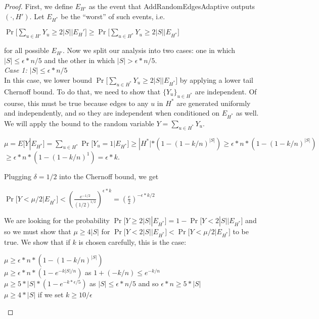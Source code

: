 \documentclass{article}
\begin{document}
\begin{proof}
First, we define $E_{H'}$ as the event that AddRandomEdgesAdaptive outputs $(\cdot, H')$. Let $E_{H^*}$ be the ``worst'' of such events, i.e.
\begin{center}
    $\Pr \big[\sum_{u \in H'} Y_u \geq 2|S| \big | E_H'\big ] \geq \Pr\big [\sum_{u \in H^*} Y_u \geq 2|S| \big | E_{H^*}\big ]$
\end{center}
for all possible $E_{H'}$. Now we split our analysis into two cases: one in which $|S| \leq \epsilon * n/5$ and the other in which $|S| > \epsilon * n/5$. \\
\textit{Case 1: $|S| \leq \epsilon * n/5$}\\

In this case, we lower bound $\Pr\big [\sum_{u \in H^*} Y_u \geq 2|S| \big | E_{H^*}\big ]$ by applying a lower tail Chernoff bound. To do that, we need to show that $\{Y_u\}_{u\in H^*}$ are independent. Of course, this must be true because edges to any $u$ in $H^*$ are generated uniformly and independently, and so they are independent when conditioned on $E_{H^*}$ as well. We will apply the bound to the random variable $Y = \sum_{u \in H^*}Y_u$.
\begin{center}
    $\mu = E[Y|E_{H^*}] = \sum_{u \in H^*} \Pr\big [Y_u = 1 \big | E_{H^*}\big ] \geq |H^*| * (1 - (1 - k/n)^{|S|}) \geq \epsilon * n * (1 - (1 - k/n)^{|S|})$\\
    $\geq \epsilon * n * (1 - (1 - k/n)^1) = \epsilon * k$. 
\end{center}
Plugging $\delta = 1/2$ into the Chernoff bound, we get
\begin{center}
    $\Pr\big [Y < \mu / 2 \big | E_{H^*}\big ] < (\frac{e^{-1/2}}{(1/2)^{1/2}}) ^{\epsilon * k} = (\frac{e}{2})^{-\epsilon*k/2}$
\end{center}

We are looking for the probability $\Pr[Y \geq 2|S| | E_{H^*}] = 1 - \Pr\big [Y < 2|S| \big | E_{H^*}\big ]$ and so we must show that $\mu \geq 4|S|$ for $\Pr\big [Y < 2|S| \big | E_{H^*}\big ] < \Pr\big [Y < \mu / 2 \big | E_{H^*}\big ]$ to be true. We show that if $k$ is chosen carefully, this is the case:

\begin{center}
    $\mu \geq \epsilon * n * (1 - (1 - k/n)^{|S|})$\\
    $\mu \geq \epsilon * n * (1 - e^{-k|S|/n})$ as $1 + (-k/n) \leq e^{-k/n}$\\
    $\mu \geq 5 * |S| * (1 - e^{-k*\epsilon / 5})$ as $|S| \leq \epsilon * n / 5$ and so $\epsilon * n \geq 5 * |S|$\\
    $\mu \geq 4 * |S|$ if we set $k \geq 10/\epsilon$
\end{center}


\end{proof}
\end{document}
